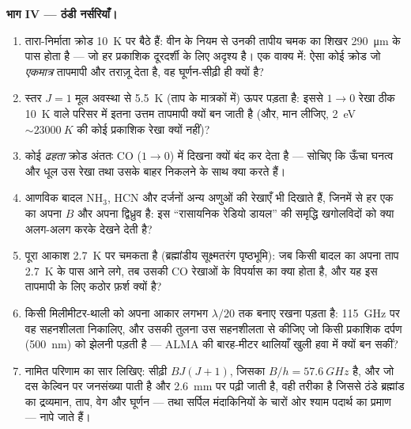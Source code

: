 \begin{problem}[{सप्ताहांत समस्या --- कार्बन मोनोऑक्साइड, रेडियो
खगोलिकी और ठंडा ब्रह्मांड}]
\medskip\noindent\textbf{भाग IV --- ठंडी नर्सरियाँ।}
\begin{enumerate}[resume]
  \item तारा-निर्माता क्रोड \qty{10}{K} पर बैठे हैं: वीन के नियम से
        उनकी तापीय चमक का शिखर \qty{290}{\micro m} के पास होता है ---
        जो हर प्रकाशिक दूरदर्शी के लिए अदृश्य है। एक वाक्य में: ऐसा
        कोई क्रोड जो \emph{एकमात्र} तापमापी और तराज़ू देता है, वह
        घूर्णन-सीढ़ी ही क्यों है?
  \item स्तर $J = 1$ मूल अवस्था से \qty{5.5}{K} (ताप के मात्रकों में)
        ऊपर पड़ता है: इससे $1\to0$ रेखा ठीक \qty{10}{K} वाले परिसर
        में इतना उत्तम तापमापी क्यों बन जाती है (और, मान लीजिए,
        \qty{2}{eV} $\sim \qty{23000}{K}$ की कोई प्रकाशिक रेखा
        क्यों नहीं)?
  \item कोई \emph{ढहता} क्रोड अंततः CO ($1\to0$) में दिखना क्यों बंद
        कर देता है --- सोचिए कि ऊँचा घनत्व और धूल उस रेखा तथा उसके
        बाहर निकलने के साथ क्या करते हैं।
  \item आणविक बादल NH$_3$, HCN और दर्जनों अन्य अणुओं की रेखाएँ भी
        दिखाते हैं, जिनमें से हर एक का अपना $B$ और अपना द्विध्रुव है:
        इस ``रासायनिक रेडियो डायल'' की समृद्धि खगोलविदों को क्या
        अलग-अलग करके देखने देती है?
  \item पूरा आकाश \qty{2.7}{K} पर चमकता है (ब्रह्मांडीय सूक्ष्मतरंग
        पृष्ठभूमि): जब किसी बादल का अपना ताप \qty{2.7}{K} के पास आने
        लगे, तब उसकी CO रेखाओं के विपर्यास का क्या होता है, और यह इस
        तापमापी के लिए कठोर फ़र्श क्यों है?
  \item किसी मिलीमीटर-थाली को अपना आकार लगभग
        $\lambda/20$ तक बनाए रखना पड़ता है: \qty{115}{GHz} पर वह
        सहनशीलता निकालिए, और उसकी तुलना उस सहनशीलता से कीजिए जो किसी
        प्रकाशिक दर्पण (\qty{500}{nm}) को झेलनी पड़ती है --- ALMA की
        बारह-मीटर थालियाँ खुली हवा में क्यों बन सकीं?
  \item नामित परिणाम का सार लिखिए: सीढ़ी $BJ(J+1)$, जिसका $B/h =
        \qty{57.6}{GHz}$ है, और जो दस केल्विन पर
        जनसंख्या पाती है और \qty{2.6}{mm} पर पढ़ी जाती है, वही तरीका
        है जिससे ठंडे ब्रह्मांड का द्रव्यमान, ताप, वेग और घूर्णन ---
        तथा सर्पिल मंदाकिनियों के चारों ओर श्याम पदार्थ का प्रमाण ---
        नापे जाते हैं।
\end{enumerate}
\end{problem}
